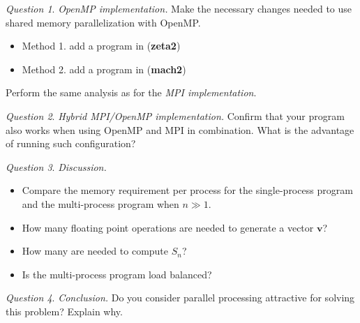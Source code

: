 \documentclass[onecolumn, oneside, a4paper, 11pt]{memoir}
\theoremstyle{remark}
\newtheorem{ex}{Question}
\begin{document}
\bigskip
\begin{ex}
\textit{OpenMP implementation.}
  Make the necessary changes needed to use shared memory parallelization with
  OpenMP.
\begin{itemize}
  \item Method 1. add a program in (\textbf{zeta2})
  \item Method 2. add a program in (\textbf{mach2})
\end{itemize}
Perform the same analysis as for the \textit{MPI implementation}.
\end{ex}

\begin{ex}
\textit{Hybrid MPI/OpenMP implementation.}
  Confirm that your program also works when using OpenMP and MPI in combination. What is the advantage of running such configuration?
\end{ex}

\bigskip
\begin{ex}
\textit{Discussion.}
\begin{itemize}
\item Compare the memory requirement per process for the single-process program and the multi-process program when $n \gg 1$.
\item How many floating point operations are needed to generate a vector $\bm v$?
\item How many are needed to compute $S_n$?
\item Is the multi-process program load balanced?
\end{itemize}
\end{ex}

\bigskip
\begin{ex}
\textit{Conclusion.}
  Do you consider parallel processing attractive for solving this problem? Explain why.
\end{ex}
\end{document}
